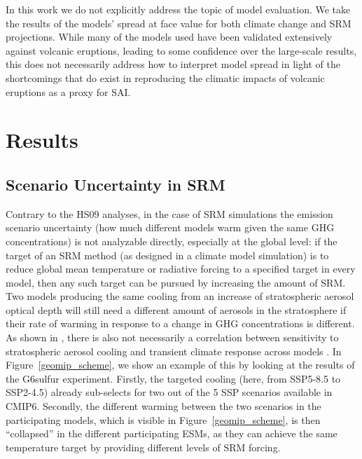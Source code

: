 \documentclass[draft]{agujournal2019}
\begin{document}
In this work we do not explicitly address the topic of model evaluation. We take the results of the models' spread at face value for both climate change and SRM projections. While many of the models used have been validated extensively against volcanic eruptions, leading to some confidence over the large-scale results, this does not necessarily address how to interpret model spread in light of the shortcomings that do exist in reproducing the climatic impacts of volcanic eruptions as a proxy for SAI.


\section{Results}

\subsection{Scenario Uncertainty in SRM}

Contrary to the HS09 analyses, in the case of SRM simulations the emission scenario uncertainty (how much different models warm given the same GHG concentrations) is not analyzable directly, especially at the global level: if the target of an SRM method (as designed in a climate model simulation) is to reduce global mean temperature or radiative forcing to a specified target in every model, then any such target can be pursued by increasing the amount of SRM. Two models producing the same cooling from an increase of stratospheric aerosol optical depth will still need a different amount of aerosols in the stratosphere if their rate of warming in response to a change in GHG concentrations is different. As shown in , there is also not necessarily a correlation between sensitivity to stratospheric aerosol cooling and transient climate response across models \cite <similarly, independently verified in CMIP6 models for volcanic eruptions in>[]{Pauling2023}. In Figure~\ref{geomip_scheme}, we show an example of this by looking at the results of the G6sulfur experiment. Firstly, the targeted cooling (here, from SSP5-8.5 to SSP2-4.5) already sub-selects for two out of the 5 SSP scenarios available in CMIP6. Secondly, the different warming between the two scenarios in the participating models, which is visible in Figure~\ref{geomip_scheme}, is then ``collapsed'' in the different participating ESMs, as they can achieve the same temperature target by providing different levels of SRM forcing.
\end{document}
